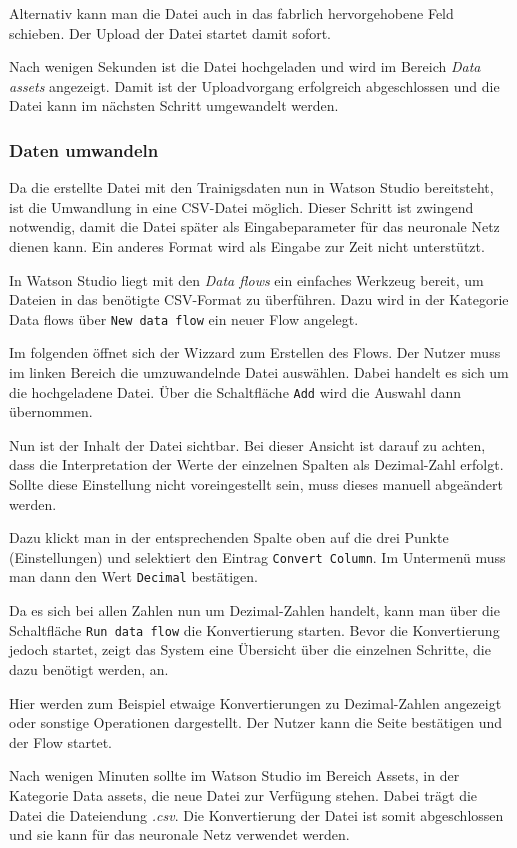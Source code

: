 Alternativ kann man die Datei auch in das fabrlich hervorgehobene Feld schieben. Der Upload der Datei startet damit
sofort.

Nach wenigen Sekunden ist die Datei hochgeladen und wird im Bereich \textit{Data assets} angezeigt. Damit ist der
Uploadvorgang erfolgreich abgeschlossen und die Datei kann im nächsten Schritt umgewandelt werden.

\subsubsection{Daten umwandeln}
Da die erstellte Datei mit den Trainigsdaten nun in Watson Studio bereitsteht, ist die Umwandlung in eine CSV-Datei
möglich. Dieser Schritt ist zwingend notwendig, damit die Datei später als Eingabeparameter für das neuronale Netz dienen
kann. Ein anderes Format wird als Eingabe zur Zeit nicht unterstützt.

In Watson Studio liegt mit den \textit{Data flows} ein einfaches Werkzeug bereit, um Dateien in das benötigte CSV-Format
zu überführen. Dazu wird in der Kategorie Data flows über \texttt{New data flow} ein neuer Flow angelegt.

Im folgenden öffnet sich der Wizzard zum Erstellen des Flows. Der Nutzer muss im linken Bereich die umzuwandelnde Datei
auswählen. Dabei handelt es sich um die hochgeladene Datei. Über die Schaltfläche \texttt{Add} wird die Auswahl dann
übernommen.

Nun ist der Inhalt der Datei sichtbar. Bei dieser Ansicht ist darauf zu achten, dass die Interpretation der Werte der
einzelnen Spalten als Dezimal-Zahl erfolgt. Sollte diese Einstellung nicht voreingestellt sein, muss dieses manuell
abgeändert werden.

Dazu klickt man in der entsprechenden Spalte oben auf die drei Punkte (Einstellungen) und selektiert den Eintrag
\texttt{Convert Column}. Im Untermenü muss man dann den Wert \texttt{Decimal} bestätigen.

Da es sich bei allen Zahlen nun um Dezimal-Zahlen handelt, kann man über die Schaltfläche \texttt{Run data flow} die
Konvertierung starten. Bevor die Konvertierung jedoch startet, zeigt das System eine Übersicht über die einzelnen
Schritte, die dazu benötigt werden, an.

Hier werden zum Beispiel etwaige Konvertierungen zu Dezimal-Zahlen angezeigt oder sonstige Operationen dargestellt. Der
Nutzer kann die Seite bestätigen und der Flow startet.

Nach wenigen Minuten sollte im Watson Studio im Bereich Assets, in der Kategorie Data assets, die neue Datei zur
Verfügung stehen. Dabei trägt die Datei die Dateiendung \textit{.csv}. Die Konvertierung der Datei ist somit abgeschlossen
und sie kann für das neuronale Netz verwendet werden.

